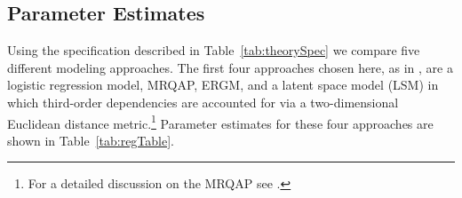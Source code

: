 \documentclass[12pt,pdflatex]{elsarticle}
\begin{document}

\subsection{Parameter Estimates}

Using the specification described in Table~\ref{tab:theorySpec} we compare five different modeling approaches. The first four approaches chosen here, as in \citet{cranmer:etal:2016}, are a logistic regression model, MRQAP, ERGM, and a latent space model (LSM) in which third-order dependencies are accounted for via a two-dimensional Euclidean distance metric.\footnote{For a detailed discussion on the MRQAP see \citet{dekker:etal:2007}.} Parameter estimates for these four approaches are shown in Table~\ref{tab:regTable}. 
\end{document}
